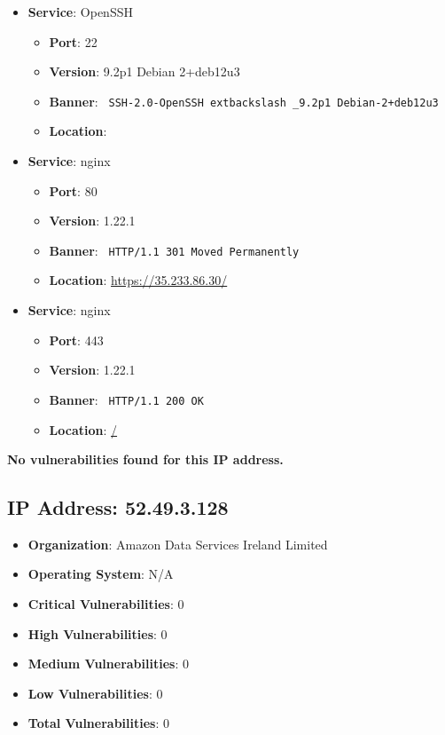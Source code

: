 \documentclass{article}
\begin{document}
\begin{itemize}
    
        \item \textbf{Service}: OpenSSH
        \begin{itemize}
            \item \textbf{Port}: 22
            \item \textbf{Version}:  9.2p1 Debian 2+deb12u3 
            \item \textbf{Banner}: \texttt{ SSH-2.0-OpenSSH	extbackslash _9.2p1 Debian-2+deb12u3 }
            \item \textbf{Location}: \href{  }{  }
        \end{itemize}
    
        \item \textbf{Service}: nginx
        \begin{itemize}
            \item \textbf{Port}: 80
            \item \textbf{Version}:  1.22.1 
            \item \textbf{Banner}: \texttt{ HTTP/1.1 301 Moved Permanently
 }
            \item \textbf{Location}: \href{ https://35.233.86.30/ }{ https://35.233.86.30/ }
        \end{itemize}
    
        \item \textbf{Service}: nginx
        \begin{itemize}
            \item \textbf{Port}: 443
            \item \textbf{Version}:  1.22.1 
            \item \textbf{Banner}: \texttt{ HTTP/1.1 200 OK
 }
            \item \textbf{Location}: \href{ / }{ / }
        \end{itemize}
    
\end{itemize}


\textbf{No vulnerabilities found for this IP address.}


\clearpage



\subsection*{IP Address: 52.49.3.128}

\begin{itemize}
    \item \textbf{Organization}: Amazon Data Services Ireland Limited
    \item \textbf{Operating System}:  N/A 
    \item \textbf{Critical Vulnerabilities}: 0
    \item \textbf{High Vulnerabilities}: 0
    \item \textbf{Medium Vulnerabilities}: 0
    \item \textbf{Low Vulnerabilities}: 0
    \item \textbf{Total Vulnerabilities}: 0
\end{itemize}
\end{document}
